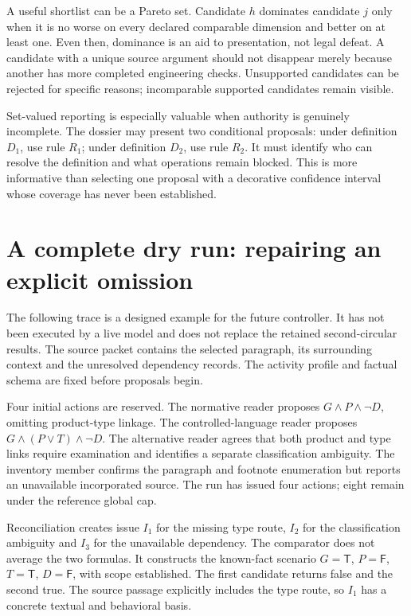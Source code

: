 \documentclass[12pt,a4paper,oneside,openany]{book}
\newcommand{\True}{\mathsf{T}}
\newcommand{\False}{\mathsf{F}}
\begin{document}
A useful shortlist can be a Pareto set. Candidate $h$ dominates candidate $j$ only
when it is no worse on every declared comparable dimension and better on at least
one. Even then, dominance is an aid to presentation, not legal defeat. A candidate
with a unique source argument should not disappear merely because another has
more completed engineering checks. Unsupported candidates can be rejected for
specific reasons; incomparable supported candidates remain visible.

Set-valued reporting is especially valuable when authority is genuinely
incomplete. The dossier may present two conditional proposals: under definition
$D_1$, use rule $R_1$; under definition $D_2$, use rule $R_2$. It must identify who
can resolve the definition and what operations remain blocked. This is more
informative than selecting one proposal with a decorative confidence interval
whose coverage has never been established.

\section{A complete dry run: repairing an explicit omission}

The following trace is a designed example for the future controller. It has not
been executed by a live model and does not replace the retained second-circular
results. The source packet contains the selected paragraph, its surrounding
context and the unresolved dependency records. The activity profile and factual
schema are fixed before proposals begin.

Four initial actions are reserved. The normative reader proposes
$G\land P\land\neg D$, omitting product-type linkage. The controlled-language
reader proposes $G\land(P\lor T)\land\neg D$. The alternative reader agrees that
both product and type links require examination and identifies a separate
classification ambiguity. The inventory member confirms the paragraph and
footnote enumeration but reports an unavailable incorporated source. The run has
issued four actions; eight remain under the reference global cap.

Reconciliation creates issue $I_1$ for the missing type route, $I_2$ for the
classification ambiguity and $I_3$ for the unavailable dependency. The comparator
does not average the two formulas. It constructs the known-fact scenario
$G=\True$, $P=\False$, $T=\True$, $D=\False$, with scope established. The first
candidate returns false and the second true. The source passage explicitly
includes the type route, so $I_1$ has a concrete textual and behavioral basis.
\end{document}
